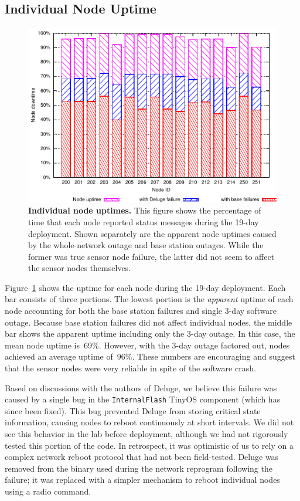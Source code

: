 \subsection{Individual Node Uptime}

\begin{figure}[t]
\begin{center}
\includegraphics[width=\hsize]{./3-evaluation/figs/robustness/nodesalive/node-uptime2.pdf}
\end{center}
\caption{\textbf{Individual node uptimes.}
This figure shows the percentage of time that each node reported status
messages during the 19-day deployment. Shown separately are the apparent node
uptimes caused by the whole-network outage and base station outages. While
the former was true sensor node failure, the latter did not seem to affect
the sensor nodes themselves.}
\label{evaluation-fig-nodeuptime}
\end{figure}

Figure~\ref{evaluation-fig-nodeuptime} shows the uptime for each node during
the 19-day deployment. Each bar consists of three portions. The lowest
portion is the \textit{apparent} uptime of each node accounting for both the
base station failures and single 3-day software outage. Because base station
failures did not affect individual nodes, the middle bar shows the apparent
uptime including only the 3-day outage. In this case, the mean node uptime
is~69\%. However, with the 3-day outage factored out, nodes achieved an
average uptime of~96\%. These numbers are encouraging and suggest that the
sensor nodes were very reliable in spite of the software crash.

Based on discussions with the authors of Deluge, we believe this failure was
caused by a single bug in the \texttt{InternalFlash} TinyOS component (which
has since been fixed). This bug prevented Deluge from storing critical state
information, causing nodes to reboot continuously at short intervals. We did
not see this behavior in the lab before deployment, although we had not
rigorously tested this portion of the code. In retrospect, it was optimistic
of us to rely on a complex network reboot protocol that had not been
field-tested.  Deluge was removed from the binary used during the network
reprogram following the failure; it was replaced with a simpler mechanism to
reboot individual nodes using a radio command.

